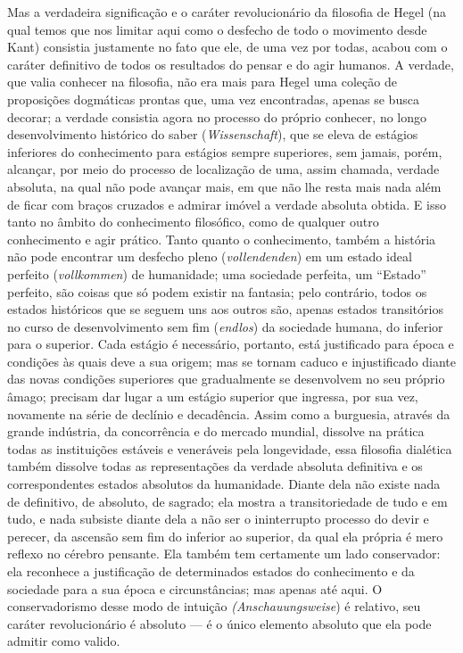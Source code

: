 Mas a verdadeira significação e o caráter revolucionário da filosofia
de Hegel (na
qual temos que nos limitar aqui como o desfecho de todo o movimento
desde Kant)
consistia justamente no fato que ele, de uma vez por todas, acabou com o
caráter definitivo de todos os resultados do pensar e do agir humanos. A
verdade, que valia conhecer na filosofia, não era mais
para Hegel uma
coleção de proposições dogmáticas prontas que, uma vez encontradas,
apenas se busca decorar; a verdade consistia agora no processo do
próprio conhecer, no longo desenvolvimento histórico do saber
(\emph{Wissenschaft}), que se eleva de estágios inferiores do
conhecimento para estágios sempre superiores, sem jamais, porém,
alcançar, por meio do processo de localização de uma, assim chamada,
verdade absoluta, na qual não pode avançar mais, em que não lhe resta
mais nada além de ficar com braços cruzados e admirar imóvel a verdade
absoluta obtida. E isso tanto no âmbito do conhecimento filosófico, como
de qualquer outro conhecimento e agir prático. Tanto quanto o
conhecimento, também a história não pode encontrar um desfecho pleno
(\emph{vollendenden}) em um estado ideal perfeito (\emph{vollkommen}) de
humanidade; uma sociedade perfeita, um ``Estado'' perfeito, são coisas
que só podem existir na fantasia; pelo contrário, todos os estados
históricos que se seguem uns aos outros são, apenas estados transitórios
no curso de desenvolvimento sem fim (\emph{endlos}) da sociedade humana,
do inferior para o superior. Cada estágio é necessário, portanto, está
justificado para época e condições às quais deve a sua origem; mas se
tornam caduco e injustificado diante das novas condições superiores que
gradualmente se desenvolvem no seu próprio âmago; precisam dar lugar a
um estágio superior que ingressa, por sua vez, novamente na série de
declínio e decadência. Assim como a burguesia, através da grande
indústria, da concorrência e do mercado mundial, dissolve na prática
todas as instituições estáveis e veneráveis pela longevidade, essa
filosofia dialética também dissolve todas as representações da verdade
absoluta definitiva e os correspondentes estados absolutos da
humanidade. Diante dela não existe nada de definitivo, de absoluto, de
sagrado; ela mostra a transitoriedade de tudo e em tudo, e nada subsiste
diante dela a não ser o ininterrupto processo do devir e perecer, da
ascensão sem fim do inferior ao superior, da qual ela própria é mero
reflexo no cérebro pensante. Ela também tem certamente um lado
conservador: ela reconhece a justificação de determinados estados do
conhecimento e da sociedade para a sua época e circunstâncias; mas
apenas até aqui. O conservadorismo desse modo de intuição
\emph{(Anschauungsweise}) é relativo, seu caráter revolucionário é
absoluto --- é o único elemento absoluto que ela pode admitir como valido.

